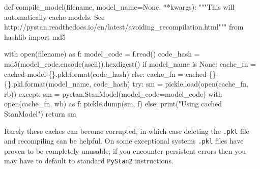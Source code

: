 \documentclass[
  letterpaper,
  DIV=11,
  numbers=noendperiod]{scrartcl}
\newenvironment{Shaded}{\begin{snugshade}}{\end{snugshade}}
\newcommand{\BuiltInTok}[1]{\textcolor[rgb]{0.00,0.23,0.31}{#1}}
\newcommand{\CommentTok}[1]{\textcolor[rgb]{0.37,0.37,0.37}{#1}}
\newcommand{\ControlFlowTok}[1]{\textcolor[rgb]{0.00,0.23,0.31}{#1}}
\newcommand{\ImportTok}[1]{\textcolor[rgb]{0.00,0.46,0.62}{#1}}
\newcommand{\KeywordTok}[1]{\textcolor[rgb]{0.00,0.23,0.31}{#1}}
\newcommand{\NormalTok}[1]{\textcolor[rgb]{0.00,0.23,0.31}{#1}}
\newcommand{\OperatorTok}[1]{\textcolor[rgb]{0.37,0.37,0.37}{#1}}
\newcommand{\SpecialCharTok}[1]{\textcolor[rgb]{0.37,0.37,0.37}{#1}}
\newcommand{\StringTok}[1]{\textcolor[rgb]{0.13,0.47,0.30}{#1}}
\newcommand{\VariableTok}[1]{\textcolor[rgb]{0.07,0.07,0.07}{#1}}
\begin{document}
\begin{Shaded}
\begin{Highlighting}[]
\KeywordTok{def}\NormalTok{ compile\_model(filename, model\_name}\OperatorTok{=}\VariableTok{None}\NormalTok{, }\OperatorTok{**}\NormalTok{kwargs):}
  \CommentTok{"""This will automatically cache models.}
\CommentTok{  }
\CommentTok{    See http://pystan.readthedocs.io/en/latest/avoiding\_recompilation.html"""}
  \ImportTok{from}\NormalTok{ hashlib }\ImportTok{import}\NormalTok{ md5}
  
  \ControlFlowTok{with} \BuiltInTok{open}\NormalTok{(filename) }\ImportTok{as}\NormalTok{ f:}
\NormalTok{    model\_code }\OperatorTok{=}\NormalTok{ f.read()}
\NormalTok{    code\_hash }\OperatorTok{=}\NormalTok{ md5(model\_code.encode(}\StringTok{\textquotesingle{}ascii\textquotesingle{}}\NormalTok{)).hexdigest()}
    \ControlFlowTok{if}\NormalTok{ model\_name }\KeywordTok{is} \VariableTok{None}\NormalTok{:}
\NormalTok{      cache\_fn }\OperatorTok{=} \StringTok{\textquotesingle{}cached{-}model{-}}\SpecialCharTok{\{\}}\StringTok{.pkl\textquotesingle{}}\NormalTok{.}\BuiltInTok{format}\NormalTok{(code\_hash)}
    \ControlFlowTok{else}\NormalTok{:}
\NormalTok{      cache\_fn }\OperatorTok{=} \StringTok{\textquotesingle{}cached{-}}\SpecialCharTok{\{\}}\StringTok{{-}}\SpecialCharTok{\{\}}\StringTok{.pkl\textquotesingle{}}\NormalTok{.}\BuiltInTok{format}\NormalTok{(model\_name, code\_hash) }
    \ControlFlowTok{try}\NormalTok{:}
\NormalTok{      sm }\OperatorTok{=}\NormalTok{ pickle.load(}\BuiltInTok{open}\NormalTok{(cache\_fn, }\StringTok{\textquotesingle{}rb\textquotesingle{}}\NormalTok{))}
    \ControlFlowTok{except}\NormalTok{:}
\NormalTok{      sm }\OperatorTok{=}\NormalTok{ pystan.StanModel(model\_code}\OperatorTok{=}\NormalTok{model\_code)}
      \ControlFlowTok{with} \BuiltInTok{open}\NormalTok{(cache\_fn, }\StringTok{\textquotesingle{}wb\textquotesingle{}}\NormalTok{) }\ImportTok{as}\NormalTok{ f:}
\NormalTok{        pickle.dump(sm, f)}
    \ControlFlowTok{else}\NormalTok{:}
       \BuiltInTok{print}\NormalTok{(}\StringTok{"Using cached StanModel"}\NormalTok{)}
    \ControlFlowTok{return}\NormalTok{ sm}
\end{Highlighting}
\end{Shaded}

Rarely these caches can become corrupted, in which case deleting the
\texttt{.pkl} file and recompiling can be helpful. On some exceptional
systems \texttt{.pkl} files have proven to be completely unusable; if
you encounter persistent errors then you may have to default to standard
\texttt{PyStan2} instructions.
\end{document}
